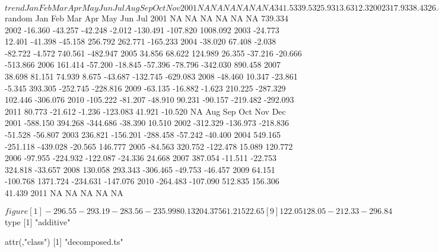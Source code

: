 \begin{center}
\begin{Schunk}
\begin{Soutput}
$trend
       Jan   Feb   Mar   Apr   May   Jun   Jul   Aug   Sep   Oct   Nov
2001    NA    NA    NA    NA    NA    NA 341.5 339.5 325.9 313.6 312.3
2002 317.9 338.4 326.4 309.2 314.8 314.4 314.1 315.3 316.4 315.6 331.2
2003 331.1 306.2 329.8 327.9 325.8 325.3 325.3 329.9 337.4 340.1 330.0
2004 351.6 354.4 365.5 356.5 353.0 361.6 367.1 361.1 354.7 353.4 347.4
2005 261.9 224.6 213.2 241.6 248.1 242.0 245.1 252.1 251.8 251.0 252.4
2006 295.7 359.2 340.8 323.0 326.2 325.9 318.1 311.1 310.5 310.0 309.1
2007 257.8 212.6 240.4 252.7 272.2 286.8 286.9 291.9 297.9 305.0 332.3
2008 369.0 379.8 386.1 391.1 366.4 350.4 348.8 346.8 345.6 356.5 344.7
2009 367.7 374.6 368.1 433.1 505.7 503.2 503.3 500.9 495.6 482.0 469.2
2010 411.8 379.9 347.8 294.4 258.6 269.1 274.6 278.4 281.8 279.2 282.4
2011 309.8 328.6 373.7 371.0 340.4 335.2    NA    NA    NA    NA    NA
       Dec
2001 309.5
2002 363.7
2003 341.6
2004 305.0
2005 244.1
2006 315.4
2007 352.1
2008 343.3
2009 443.9
2010 302.8
2011    NA

$random
          Jan      Feb      Mar      Apr      May      Jun      Jul
2001       NA       NA       NA       NA       NA       NA  739.334
2002  -16.360  -43.257  -42.248   -2.012 -130.491 -107.820 1008.092
2003  -24.773   12.401  -41.398  -45.158  256.792  262.771 -165.233
2004  -38.020   67.408   -2.038  -82.722   -4.572  740.561 -482.947
2005   34.856   68.622  124.989   26.355  -37.216  -20.666 -513.866
2006  161.414  -57.200  -18.845  -57.396  -78.796 -342.030  890.458
2007   38.698   81.151   74.939    8.675  -43.687 -132.745 -629.083
2008  -48.460   10.347  -23.861   -5.345  393.305 -252.745 -228.816
2009  -63.135  -16.882   -1.623  210.225 -287.329  102.446 -306.076
2010 -105.222  -81.207  -48.910   90.231  -90.157 -219.482 -292.093
2011   80.773  -21.612   -1.236 -123.083   41.921  -10.520       NA
          Aug      Sep      Oct      Nov      Dec
2001 -588.150  394.268 -344.686  -38.390   10.510
2002 -312.329 -136.973 -218.836  -51.528  -56.807
2003  236.821 -156.201 -288.458  -57.242  -40.400
2004  549.165 -251.118 -439.028  -20.565  146.777
2005  -84.563  320.752 -122.478   15.089  120.772
2006  -97.955 -224.932 -122.087  -24.336   24.668
2007  387.054  -11.511  -22.753  324.818  -33.657
2008  130.058  293.343 -306.465  -49.753  -46.457
2009   64.151 -100.768 1371.724 -234.631 -147.076
2010 -264.483 -107.090  512.835  156.306   41.439
2011       NA       NA       NA       NA       NA

$figure
 [1] -296.55 -293.19 -283.56 -235.99   80.13  204.37  561.21  522.65
 [9]  122.05  128.05 -212.33 -296.84

$type
[1] "additive"

attr(,"class")
[1] "decomposed.ts"
\end{Soutput}
\end{Schunk}
\end{center}


